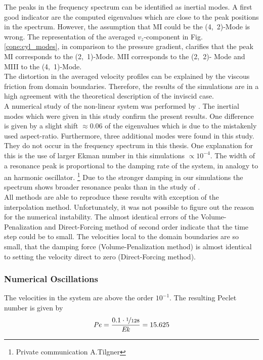 The peaks in the frequency spectrum can be identified as inertial modes.
A first good indicator are the computed eigenvalues which are close to the peak positions in the spectrum.
However, the assumption that M\RN{1} could be the (4,~2)-Mode is wrong.
The representation of the averaged $v_z$-component in Fig. \ref{cone:cyl_modes}, in comparison to the pressure gradient,
clarifies that the peak M\RN{1} corresponds to the (2,~1)-Mode.
M\RN{2} corresponds to the (2,~2)- Mode and M\RN{3}  to the (4,~1)-Mode.\\
The distortion in the averaged velocity profiles can be explained by the viscous friction from domain boundaries.
Therefore, the results of the simulations are in a high agreement with the theoretical description of the inviscid case.
\\
A numerical study of the non-linear system was performed by \citep{Sauret2012}.
The inertial modes which were given in this study confirm the present results.
One difference is given by a slight shift $\approx0.06$ of the eigenvalues which is
due to the mistakenly used aspect-ratio.
Furthermore, three additional modes were found in this study. They do not occur
in the frequency spectrum in this thesis.
One explanation for this is the use of larger Ekman number in this simulations $\propto10^{-4}$.
The width of a resonance peak is proportional to the damping rate of the system, in analogy to an harmonic oscillator.
\footnote{Private communication A.Tilgner}
Due to the stronger damping in our simulations the spectrum shows broader resonance peaks than in the study of \citep{Sauret2012}.\\
All methods are able to reproduce these results with exception of the interpolation method.
Unfortunately, it was not possible to figure out the reason for the numerical instability.
The almost identical errors of the Volume-Penalization and Direct-Forcing method of second order
indicate that the time step could be to small.
The velocities local to the domain boundaries are so small, that the damping force (Volume-Penalization method) is almost identical
to setting the velocity direct to zero (Direct-Forcing method).

\subsubsection{Numerical Oscillations}

The velocities in the system are above the  order $10^{-1}$. The resulting Peclet number is
given by
\begin{align}
    \mbox{\textit{Pe}} = \frac{0.1\cdot\nicefrac{1}{128}}{\mbox{\textit{Ek}}} =15.625
\end{align}

